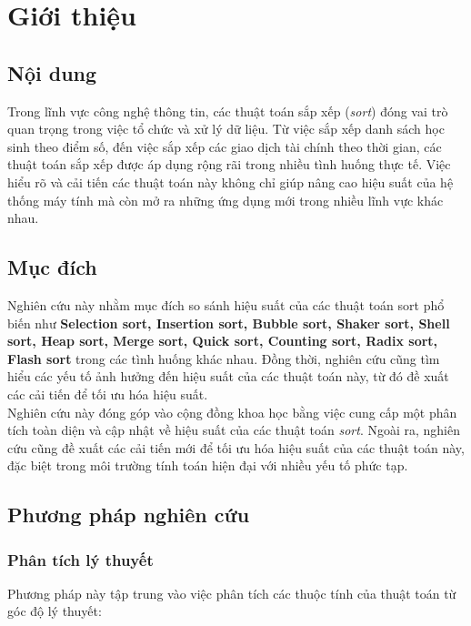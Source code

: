 \section{Giới thiệu}

\subsection{Nội dung}
Trong lĩnh vực công nghệ thông tin, các thuật toán sắp xếp (\textit{sort}) đóng vai trò quan trọng trong việc tổ chức và xử lý dữ liệu. Từ việc sắp xếp danh sách học sinh theo điểm số, đến việc sắp xếp các giao dịch tài chính theo thời gian, các thuật toán sắp xếp được áp dụng rộng rãi trong nhiều tình huống thực tế. Việc hiểu rõ và cải tiến các thuật toán này không chỉ giúp nâng cao hiệu suất của hệ thống máy tính mà còn mở ra những ứng dụng mới trong nhiều lĩnh vực khác nhau.
\subsection{Mục đích}
Nghiên cứu này nhằm mục đích so sánh hiệu suất của các thuật toán sort phổ biến như \textbf{Selection sort, Insertion sort, Bubble sort, Shaker sort, Shell sort, Heap sort, Merge sort, Quick sort, Counting sort, Radix sort, Flash sort} trong các tình huống khác nhau. Đồng thời, nghiên cứu cũng tìm hiểu các yếu tố ảnh hưởng đến hiệu suất của các thuật toán này, từ đó đề xuất các cải tiến để tối ưu hóa hiệu suất.\\
Nghiên cứu này đóng góp vào cộng đồng khoa học bằng việc cung cấp một phân tích toàn diện và cập nhật về hiệu suất của các thuật toán \textit{sort}. Ngoài ra, nghiên cứu cũng đề xuất các cải tiến mới để tối ưu hóa hiệu suất của các thuật toán này, đặc biệt trong môi trường tính toán hiện đại với nhiều yếu tố phức tạp.

\subsection{Phương pháp nghiên cứu}

\subsubsection{Phân tích lý thuyết}
Phương pháp này tập trung vào việc phân tích các thuộc tính của thuật toán từ góc độ lý thuyết:

